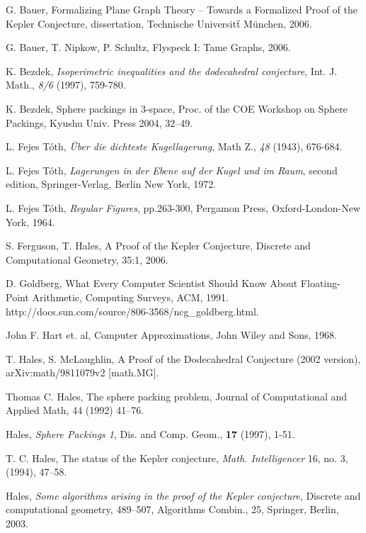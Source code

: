 \documentclass{llncs}
\begin{document}
\begin{thebibliography}{HeHa94}

 G. Bauer, Formalizing Plane Graph
Theory -- Towards a Formalized Proof of the Kepler
Conjecture, dissertation, Technische
Universit\"t M\"unchen, 2006.

 G. Bauer, T. Nipkow, P. Schultz,
Flyspeck I: Tame Graphs, 2006.

 K. Bezdek, {\it Isoperimetric inequalities and the
dodecahedral conjecture}, Int. J. Math., \emph{8/6} (1997), 759-780.

 K. Bezdek, Sphere packings in $3$-space,
Proc. of the COE Workshop on Sphere Packings, Kyushu Univ. Press 2004, 32--49.

 L. Fejes T\'oth, {\it \"Uber die dichteste
Kugellagerung}, Math Z., \emph{48} (1943), 676-684.

 L. Fejes T\'oth, {\it Lagerungen in der Ebene auf der
    Kugel und im Raum}, second edition,
    Springer-Verlag, Berlin New York, 1972.

 L. Fejes T\'oth, {\it Regular Figures}, pp.263-300,
Pergamon Press, Oxford-London-New York, 1964.


 S. Ferguson, T. Hales, A Proof of the
Kepler Conjecture, 
Discrete and Computational Geometry, 35:1, 2006.

 D. Goldberg, What Every Computer Scientist Should
Know About Floating-Point Arithmetic, Computing Surveys, ACM, 1991.
http://docs.sun.com/source/806-3568/ncg\_goldberg.html.

 John F. Hart et. al, Computer Approximations, John
Wiley and Sons, 1968.

 T. Hales, S. McLaughlin,
A Proof of the Dodecahedral Conjecture (2002 version),  	arXiv:math/9811079v2 [math.MG].

 Thomas C. Hales, The sphere packing problem, Journal
of Computational and Applied Math, 44 (1992) 41--76.

 Hales, {\it Sphere Packings 1}, Dis. and Comp. Geom., 
{\bf 17} (1997), 1-51.

 T. C. Hales, The status of the Kepler conjecture,
    {\it Math. Intelligencer} 16, no. 3, (1994), 47--58.

 Hales, {\it Some algorithms arising in the proof of the
	Kepler conjecture}, 
	Discrete and computational
geometry, 489--507, Algorithms Combin., 25, Springer, Berlin,
2003.
	

\end{thebibliography}
\end{document}
